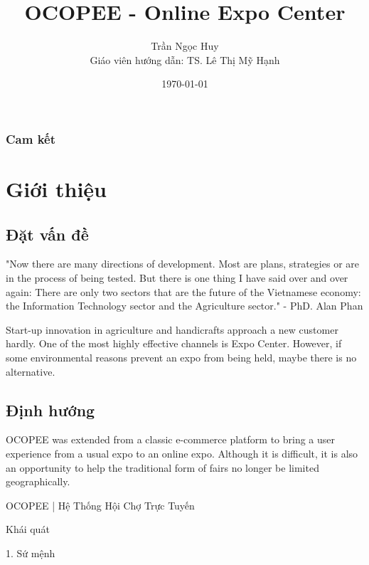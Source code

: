 \documentclass{report}
\title{OCOPEE - Online Expo Center}
\author{Trần Ngọc Huy\\[1cm]{\small Giáo viên hướng dẫn: TS. Lê Thị Mỹ Hạnh}}
\date{\today}
\begin{document}
\section*{Cam kết}

	\pagebreak
	\newpage
	\setcounter{page}{1}
	\newpage
	\tableofcontents
	\listoffigures
	


\newpage
{}


\part*{Giới thiệu}
	\chapter*{Đặt vấn đề}
	
	"Now there are many directions of development. Most are plans, strategies or are in the process of being tested. But there is one thing I have said over and over again: There are only two sectors that are the future of the Vietnamese economy: the Information Technology sector and the Agriculture sector." - PhD. Alan Phan
	
	Start-up innovation in agriculture and handicrafts approach a new customer hardly. 
	One of the most highly effective channels is Expo Center.
	However, if some environmental reasons prevent an expo from being held, maybe there is no alternative.
	\chapter*{Định hướng}
	OCOPEE was extended from a classic e-commerce platform to bring a user experience from a usual expo to an online expo. Although it is difficult, it is also an opportunity to help the traditional form of fairs no longer be limited geographically.





OCOPEE | Hệ Thống Hội Chợ Trực Tuyến

Khái quát

1. Sứ mệnh
\end{document}
